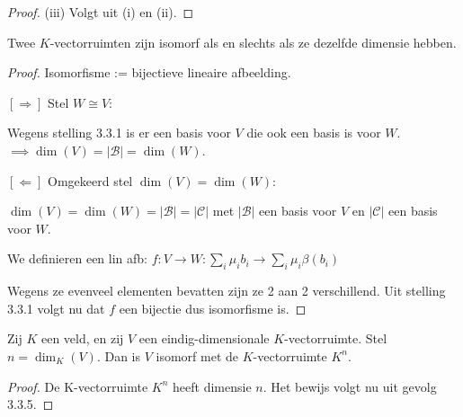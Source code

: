 \begin{proof}(iii)
    Volgt uit (i) en (ii).
\end{proof}

\begin{gevolg}[3.3.5]
    Twee $K$-vectorruimten zijn isomorf als en slechts als ze dezelfde dimensie hebben.
\end{gevolg}
\begin{proof}
    Isomorfisme := bijectieve lineaire afbeelding.

    \([\Rightarrow]\) Stel \(W \cong V\):

    Wegens stelling 3.3.1 is er een basis voor \(V\) die ook een basis is voor \(W\).
     \(\implies \dim(V) = |\mathcal{B}| = \dim(W)\).

    \([\Leftarrow]\) Omgekeerd stel \(\dim(V) = \dim(W)\):

    \(\dim(V) = \dim(W) = |\mathcal{B}|=|\mathcal{C}|\)
    met \(|\mathcal{B}|\) een basis voor \(V\) en \(|\mathcal{C}|\) een basis voor \(W\).

    We definieren een lin afb: \(f \colon V \to W: \sum_i \mu_i b_i \to \sum_i \mu_i \beta(b_i)\)

    Wegens ze evenveel elementen bevatten zijn ze 2 aan 2 verschillend. 
    Uit stelling 3.3.1 volgt nu dat \(f\) een bijectie dus isomorfisme is.
\end{proof}

\begin{gevolg}[3.3.6]
    Zij $K$ een veld, en zij $V$ een eindig-dimensionale $K$-vectorruimte. Stel $n = \dim_K(V)$. Dan is $V$ isomorf met de $K$-vectorruimte $K^n$.
\end{gevolg}
\begin{proof}
    De K-vectorruimte \(K^n\) heeft dimensie \(n\). Het bewijs volgt nu uit gevolg 3.3.5.
\end{proof}

